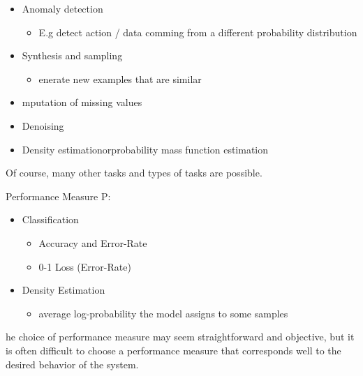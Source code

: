 \documentclass[../Main.tex]{subfiles}
\begin{document}
\begin{itemize}
    \item Anomaly detection
        \begin{itemize}
            \item E.g detect action / data comming from a different probability distribution
        \end{itemize}
    \item Synthesis and sampling
        \begin{itemize}
            \item enerate new examples that are similar
        \end{itemize}
    \item mputation of missing values
    \item Denoising
    \item Density estimationorprobability mass function estimation
\end{itemize}
Of course, many other tasks and types of tasks are possible.

Performance Measure P:
\begin{itemize}
    \item Classification
        \begin{itemize}
            \item Accuracy and Error-Rate
            \item 0-1 Loss (Error-Rate)
        \end{itemize}
    \item Density Estimation
        \begin{itemize}
            \item average log-probability the model assigns to some samples
        \end{itemize}
\end{itemize}
he choice of performance measure may seem straightforward
and objective, but it is often diﬃcult to choose a performance 
measure that corresponds well to the desired behavior of the system.


\end{document}
